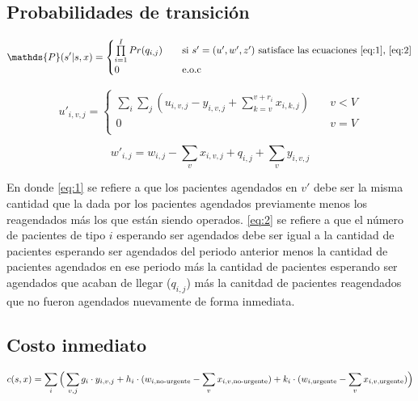 \documentclass[letterpaper,10pt]{article}
\begin{document}
    \subsection*{Probabilidades de transición}
    
    \[
    \mathds{P}(s'| s, x) =
         \begin{cases}
            \prod \limits_{i=1}^I Pr(q_{i,j}) & \quad \text{si $s' = (u', w', z')$ satisface las ecuaciones \eqref{eq:1}, \eqref{eq:2}} \\
            
           0 & \quad\text{e.o.c }  \\
         \end{cases}
    \]
    
    \begin{equation}\label{eq:1}
        u'_{i,v,j} =
        \begin{cases} %
            \sum\limits_{i}\sum\limits_{j} (u_{i,v,j} - y_{i,v,j} + \sum\limits_{k = v}^{v + r_i} x_{i,k,j}) &\quad v < V \\ 
        
            0 & \quad v = V  \\
        \end{cases}
    \end{equation}
    
    \begin{equation}\label{eq:2}
        w'_{i,j} = w_{i,j} - \sum\limits_{v}x_{i,v,j} + q_{i,j} + \sum\limits_{v}y_{i,v,j}
    \end{equation}

    En donde \eqref{eq:1} se refiere a que los pacientes agendados en $v'$ debe ser la misma cantidad que la dada por los pacientes agendados previamente  menos los reagendados más los que están siendo operados. \eqref{eq:2} se refiere a que el número de pacientes de tipo $i$ esperando ser agendados debe ser igual a la cantidad de pacientes esperando ser agendados del periodo anterior menos la cantidad de pacientes agendados en ese periodo más la cantidad de pacientes esperando ser agendados que acaban de llegar ($q_{i,j}$) más la canitdad de pacientes reagendados que no fueron agendados nuevamente de forma inmediata.
    
\subsection*{Costo inmediato}

    $$ c(s, x) = \sum\limits_{i}\Big{(} \sum\limits_{v,j}g_{i} \cdot y_{i,v,j} +  h_i \cdot (w_{i,\text{no-urgente}} - \sum\limits_{v} x_{i,v,\text{no-urgente}}) +  k_i \cdot (w_{i,\text{urgente}} -\sum\limits_{v} x_{i,v,\text{urgente}})\Big{)}$$
    
\end{document}
